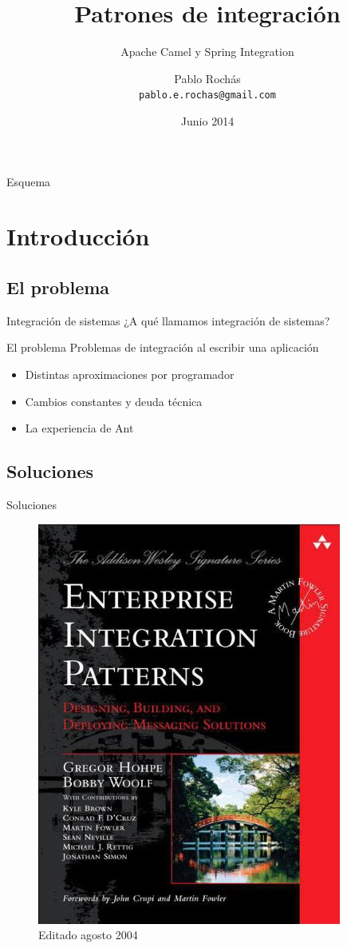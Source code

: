 \documentclass{beamer}
\title{Patrones de integración}
\subtitle{Apache Camel y Spring Integration}
\author[Despegar.com]{Pablo Rochás\\ \texttt{pablo.e.rochas@gmail.com}}
\date[Despegar]{Junio 2014}
\begin{document}
\begin{frame}
\titlepage
\end{frame}

\begin{frame}{Esquema}
  \tableofcontents
\end{frame}

\section{Introducción}
\subsection{El problema}
\begin{frame}{Integración de sistemas}
¿A qué llamamos integración de sistemas?
\end{frame}

\begin{frame}{El problema}
Problemas de integración al escribir una aplicación
\begin{itemize}[<+->]
\item Distintas aproximaciones por programador
\item Cambios constantes y deuda técnica
\item La experiencia de Ant
\end{itemize}
\end{frame}

\subsection{Soluciones}
\begin{frame}{Soluciones}
\begin{figure}
\includegraphics[scale=0.4]{TAPA}
\caption{Editado agosto 2004}
\end{figure}
\end{frame}
\end{document}
